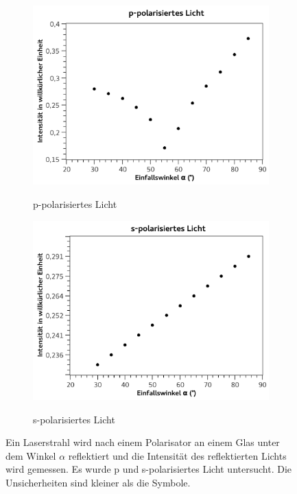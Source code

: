 \documentclass[
	a4paper,
	12pt,
	pagesize,
	ngerman
]{scrartcl}
\begin{document}
	\begin{figure}[H]
		\centering
		\begin{subfigure}[t]{0.5\textwidth}
			\centering
			\includegraphics[width=1\textwidth]{fig_ppol}
			\label{fig_ppol}
			\caption{p-polarisiertes Licht}
		\end{subfigure}%
		\begin{subfigure}[t]{0.5\textwidth}
			\centering
			\includegraphics[width=1\textwidth]{fig_spol}
			\label{fig_spol}
			\caption{s-polarisiertes Licht}
		\end{subfigure}
		\label{fig_pol}
		\caption{Ein Laserstrahl wird nach einem Polarisator an einem Glas unter dem Winkel $\alpha$ reflektiert und die Intensität des reflektierten Lichts wird gemessen. 
		Es wurde p und s-polarisiertes Licht untersucht.
		Die Unsicherheiten sind kleiner als die Symbole.}

	\end{figure}
\end{document}
